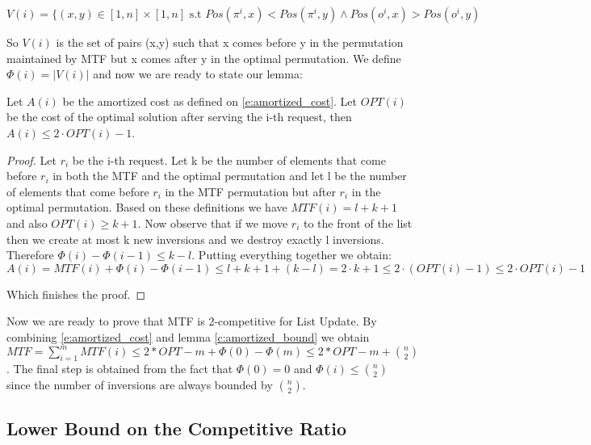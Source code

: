 \begin{equation*}
    V(i) = \{ ( x,y ) \in [1, n] \times [1,n] \text{ s.t } Pos( \pi^i, x ) < Pos( \pi^i, y ) \land Pos( o^i, x ) > Pos( o^i, y )
\end{equation*}

So $V(i)$ is the set of pairs (x,y) such that x comes before y in the permutation maintained by MTF but x comes after y in the optimal permutation. We define $\Phi(i) = |V(i)|$ and now we are ready to state our lemma:

\begin{claim}\label{c:amortized_bound}
    Let $A(i)$ be the amortized cost as defined on \ref{e:amortized_cost}. Let $OPT(i)$ be the cost of the optimal solution after serving the i-th request, then $A(i) \leq 2 \cdot OPT(i)-1$.
\end{claim}

\begin{proof}
    Let $r_i$ be the i-th request. Let k be the number of elements that come before $r_i$ in both the MTF and the optimal permutation and let l be the number of elements that come before $r_i$ in the MTF permutation but after $r_i$ in the optimal permutation. Based on these definitions we have $MTF(i) = l + k + 1$ and also $OPT(i) \geq k + 1$. Now observe that if we move $r_i$ to the front of the list then we create at most k new inversions and we destroy exactly l inversions. Therefore $\Phi(i) - \Phi(i-1) \leq k - l$. Putting everything together we obtain:
    \begin{equation*}
        A(i) = MTF(i) + \Phi(i) - \Phi(i-1) \leq l + k + 1 + ( k - l ) = 2 \cdot k + 1 \leq 2 \cdot ( OPT(i) - 1 ) \leq 2 \cdot OPT(i) - 1
    \end{equation*}
    
    \noindent Which finishes the proof.
\end{proof}

Now we are ready to prove that MTF is 2-competitive for List Update. By combining \ref{e:amortized_cost} and lemma \ref{c:amortized_bound} we obtain $MTF = \sum_{i=1}^m MTF(i) \leq 2*OPT - m + \Phi(0) - \Phi(m) \leq 2*OPT - m + \binom{n}{2}$. The final step is obtained from the fact that $\Phi(0) = 0$ and $\Phi(i) \leq \binom{n}{2}$ since the number of inversions are always bounded by $\binom{n}{2}$.

\subsection{Lower Bound on the Competitive Ratio}

